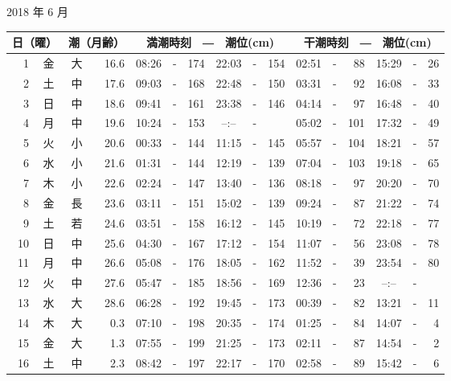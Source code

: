 \documentclass[12pt.a4j]{jsarticle}
\begin{document}
\begin{center}
 {\large 2018 年  6 月}\\
 \begin{table}[ht]
    \begin{tabular}{|rc|cr|ccrccr|ccrccr|}
    \hline
    \multicolumn{2}{|c|}{日（曜）} & \multicolumn{2}{c|}{潮（月齢）} & \multicolumn{6}{c|}{満潮時刻　―　潮位(cm)} & \multicolumn{6}{c|}{干潮時刻　―　潮位(cm)} \\
 \hline
 1 & 金 & 大 & 16.6 &  08:26 &-& 174  &  22:03 &-& 154  &   02:51 &-&  88  &   15:29 &-&  26  \\
 2 & 土 & 中 & 17.6 &  09:03 &-& 168  &  22:48 &-& 150  &   03:31 &-&  92  &   16:08 &-&  33  \\
 3 & 日 & 中 & 18.6 &  09:41 &-& 161  &  23:38 &-& 146  &   04:14 &-&  97  &   16:48 &-&  40  \\
 4 & 月 & 中 & 19.6 &  10:24 &-& 153  &  --:-- &-&     &   05:02 &-& 101  &   17:32 &-&  49  \\
 5 & 火 & 小 & 20.6 &  00:33 &-& 144  &  11:15 &-& 145  &   05:57 &-& 104  &   18:21 &-&  57  \\
 6 & 水 & 小 & 21.6 &  01:31 &-& 144  &  12:19 &-& 139  &   07:04 &-& 103  &   19:18 &-&  65  \\
 7 & 木 & 小 & 22.6 &  02:24 &-& 147  &  13:40 &-& 136  &   08:18 &-&  97  &   20:20 &-&  70  \\
 8 & 金 & 長 & 23.6 &  03:11 &-& 151  &  15:02 &-& 139  &   09:24 &-&  87  &   21:22 &-&  74  \\
 9 & 土 & 若 & 24.6 &  03:51 &-& 158  &  16:12 &-& 145  &   10:19 &-&  72  &   22:18 &-&  77  \\
10 & 日 & 中 & 25.6 &  04:30 &-& 167  &  17:12 &-& 154  &   11:07 &-&  56  &   23:08 &-&  78  \\
11 & 月 & 中 & 26.6 &  05:08 &-& 176  &  18:05 &-& 162  &   11:52 &-&  39  &   23:54 &-&  80  \\
12 & 火 & 中 & 27.6 &  05:47 &-& 185  &  18:56 &-& 169  &   12:36 &-&  23  &   --:-- &-&     \\
13 & 水 & 大 & 28.6 &  06:28 &-& 192  &  19:45 &-& 173  &   00:39 &-&  82  &   13:21 &-&  11  \\
14 & 木 & 大 &  0.3 &  07:10 &-& 198  &  20:35 &-& 174  &   01:25 &-&  84  &   14:07 &-&   4  \\
15 & 金 & 大 &  1.3 &  07:55 &-& 199  &  21:25 &-& 173  &   02:11 &-&  87  &   14:54 &-&   2  \\
16 & 土 & 中 &  2.3 &  08:42 &-& 197  &  22:17 &-& 170  &   02:58 &-&  89  &   15:42 &-&   6  \\

\end{tabular}
\end{table}
\end{center}
\end{document}
